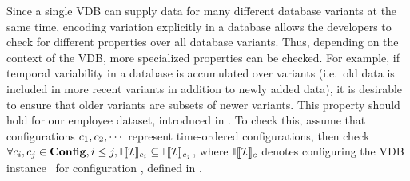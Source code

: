 \noindent
%
%
 Since a single VDB can supply data for many different database variants at the
 same time, encoding variation explicitly in a database allows the developers
 to check for different properties over all database variants.
%
Thus, depending on the context of the VDB, more specialized properties can be checked.
For example, if temporal variability in a database is accumulated over
variants (i.e.\ old data is included in more recent variants in addition to
newly added data), it is desirable to ensure that older variants are subsets of
newer variants.
%
This property should hold for our employee dataset, introduced in 
. To check this, 
assume that configurations \ensuremath{\config_1, \config_2, \cdots}
represent time-ordered configurations, then check
\ensuremath{
\forall \config_i, \config_j \in \confSet, i \le j, \odbSem [\config_i] {\vdbInst} \subseteq \odbSem [\config_j]{\vdbInst}
}, 
where \ensuremath{\odbSem[\config]{\vdbInst}} denotes configuring the VDB instance
\vdbInst\ for configuration \config, defined in .



